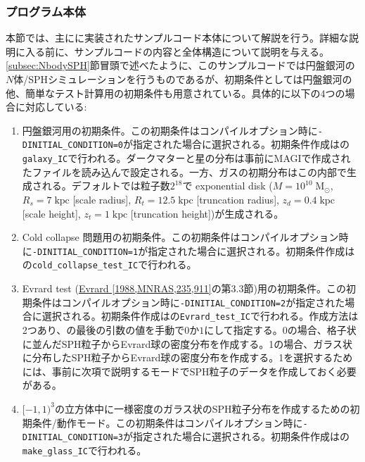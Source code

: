 \subsubsection{プログラム本体}
\label{subsubsec:nbodysph_main_routine}
本節では、主に\fileNameOfMainFunc に実装されたサンプルコード本体について解説を行う。詳細な説明に入る前に、サンプルコードの内容と全体構造について説明を与える。\ref{subsec:NbodySPH}節冒頭で述べたように、このサンプルコードでは円盤銀河の$N$体/SPHシミュレーションを行うものであるが、初期条件としては円盤銀河の他、簡単なテスト計算用の初期条件も用意されている。具体的に以下の4つの場合に対応している:
\begin{enumerate}[leftmargin=*,itemsep=-1ex,label=(\alph*)]
\item 円盤銀河用の初期条件。この初期条件はコンパイルオプション時に\texttt{-DINITIAL\_CONDITION=0}が指定された場合に選択される。初期条件作成はの\procedure \texttt{galaxy\_IC}で行われる。ダークマターと星の分布は事前に\textsc{MAGI}で作成されたファイルを読み込んで設定される。一方、ガスの初期分布はこの\procedure 内部で生成される。デフォルトでは粒子数$2^{18}$で exponential disk ($M=10^{10}\;\mathrm{M_{\odot}}$, $R_{s}=7\;\mathrm{kpc}$ [scale radius], $R_{t}=12.5\;\mathrm{kpc}$ [truncation radius], $z_{d}=0.4\;\mathrm{kpc}$ [scale height], $z_{t}=1\;\mathrm{kpc}$ [truncation height])が生成される。
\item Cold collapse 問題用の初期条件。この初期条件はコンパイルオプション時に\texttt{-DINITIAL\_CONDITION=1}が指定された場合に選択される。初期条件作成はの\procedure \texttt{cold\_collapse\_test\_IC}で行われる。
\item Evrard test (\href{https://doi.org/10.1093/mnras/235.3.911}{Evrard [1988,MNRAS,235,911]}の第3.3節)用の初期条件。この初期条件はコンパイルオプション時に\texttt{-DINITIAL\_CONDITION=2}が指定された場合に選択される。初期条件作成はの\procedure \texttt{Evrard\_test\_IC}で行われる。作成方法は2つあり、\procedure の最後の引数の値を手動で$0$か$1$にして指定する。0の場合、格子状に並んだSPH粒子からEvrard球の密度分布を作成する。1の場合、ガラス状に分布したSPH粒子からEvrard球の密度分布を作成する。1を選択するためには、事前に次項で説明するモードでSPH粒子のデータを作成しておく必要がある。
\item $[-1,1)^{3}$の立方体中に一様密度のガラス状のSPH粒子分布を作成するための初期条件/動作モード。この初期条件はコンパイルオプション時に\texttt{-DINITIAL\_CONDITION=3}が指定された場合に選択される。初期条件作成はの\procedure \texttt{make\_glass\_IC}で行われる。
\end{enumerate}


